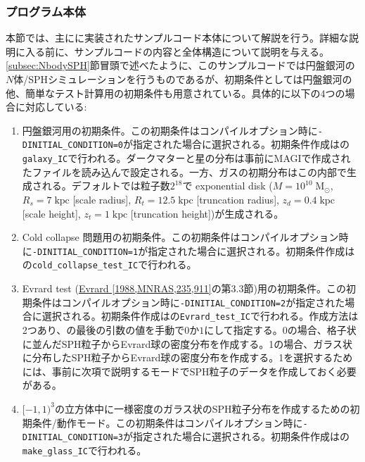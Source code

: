 \subsubsection{プログラム本体}
\label{subsubsec:nbodysph_main_routine}
本節では、主に\fileNameOfMainFunc に実装されたサンプルコード本体について解説を行う。詳細な説明に入る前に、サンプルコードの内容と全体構造について説明を与える。\ref{subsec:NbodySPH}節冒頭で述べたように、このサンプルコードでは円盤銀河の$N$体/SPHシミュレーションを行うものであるが、初期条件としては円盤銀河の他、簡単なテスト計算用の初期条件も用意されている。具体的に以下の4つの場合に対応している:
\begin{enumerate}[leftmargin=*,itemsep=-1ex,label=(\alph*)]
\item 円盤銀河用の初期条件。この初期条件はコンパイルオプション時に\texttt{-DINITIAL\_CONDITION=0}が指定された場合に選択される。初期条件作成はの\procedure \texttt{galaxy\_IC}で行われる。ダークマターと星の分布は事前に\textsc{MAGI}で作成されたファイルを読み込んで設定される。一方、ガスの初期分布はこの\procedure 内部で生成される。デフォルトでは粒子数$2^{18}$で exponential disk ($M=10^{10}\;\mathrm{M_{\odot}}$, $R_{s}=7\;\mathrm{kpc}$ [scale radius], $R_{t}=12.5\;\mathrm{kpc}$ [truncation radius], $z_{d}=0.4\;\mathrm{kpc}$ [scale height], $z_{t}=1\;\mathrm{kpc}$ [truncation height])が生成される。
\item Cold collapse 問題用の初期条件。この初期条件はコンパイルオプション時に\texttt{-DINITIAL\_CONDITION=1}が指定された場合に選択される。初期条件作成はの\procedure \texttt{cold\_collapse\_test\_IC}で行われる。
\item Evrard test (\href{https://doi.org/10.1093/mnras/235.3.911}{Evrard [1988,MNRAS,235,911]}の第3.3節)用の初期条件。この初期条件はコンパイルオプション時に\texttt{-DINITIAL\_CONDITION=2}が指定された場合に選択される。初期条件作成はの\procedure \texttt{Evrard\_test\_IC}で行われる。作成方法は2つあり、\procedure の最後の引数の値を手動で$0$か$1$にして指定する。0の場合、格子状に並んだSPH粒子からEvrard球の密度分布を作成する。1の場合、ガラス状に分布したSPH粒子からEvrard球の密度分布を作成する。1を選択するためには、事前に次項で説明するモードでSPH粒子のデータを作成しておく必要がある。
\item $[-1,1)^{3}$の立方体中に一様密度のガラス状のSPH粒子分布を作成するための初期条件/動作モード。この初期条件はコンパイルオプション時に\texttt{-DINITIAL\_CONDITION=3}が指定された場合に選択される。初期条件作成はの\procedure \texttt{make\_glass\_IC}で行われる。
\end{enumerate}


